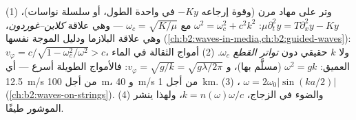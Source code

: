 \begin{example}\label{ex:b2:dispersion-wave-packets:examples}
(1) وتر على مهاد مرن (وقوة إرجاعه $-Ky$ في واحدة الطول،
أو سلسلة نواسات)، $\mu\partial_t^2y = T\partial_x^2y - Ky$: $\omega^2 = \omega_c^2
+ c^2k^2$ مع $\omega_c = \sqrt{K/\mu}$ --- وهي علاقة \emph{كلاين--غوردون}،
وهي علاقة البلازما ودليل الموجة نفسها
(\cref{ch:b2:waves-in-media,ch:b2:guided-waves}): $v_\varphi = c/\sqrt{1 -
\omega_c^2/\omega^2} > c$، ولا $k$ حقيقي دون \emph{تواتر القطع} $\omega_c$.
(2) أمواج الثقالة في الماء العميق: $\omega^2 = gk$ (مسلَّم بها)، و $v_\varphi =
\sqrt{g/k} = \sqrt{g\lambda/2\pi}$: فالأمواج الطويلة أسرع --- أي \qty{12.5}{m/s} من أجل
\qty{100}{m}، و \qty{40}{m/s} من أجل \qty{1}{km}. (3) ، $\omega =
2\omega_0|\sin(ka/2)|$ (\cref{ch:b2:waves-on-strings}). (4) والضوء في الزجاج،
$k = n(\omega)\omega/c$، ولهذا ينشر الموشور طيفًا.
\end{example}

